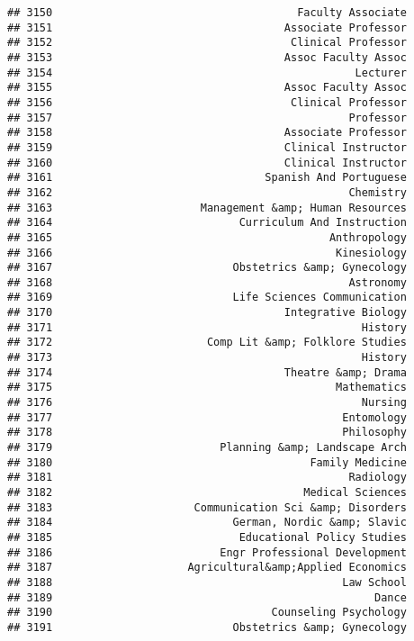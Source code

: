 \documentclass[
]{article}
\begin{document}
\begin{verbatim}
## 3150                                      Faculty Associate
## 3151                                    Associate Professor
## 3152                                     Clinical Professor
## 3153                                    Assoc Faculty Assoc
## 3154                                               Lecturer
## 3155                                    Assoc Faculty Assoc
## 3156                                     Clinical Professor
## 3157                                              Professor
## 3158                                    Associate Professor
## 3159                                    Clinical Instructor
## 3160                                    Clinical Instructor
## 3161                                 Spanish And Portuguese
## 3162                                              Chemistry
## 3163                       Management &amp; Human Resources
## 3164                             Curriculum And Instruction
## 3165                                           Anthropology
## 3166                                            Kinesiology
## 3167                            Obstetrics &amp; Gynecology
## 3168                                              Astronomy
## 3169                            Life Sciences Communication
## 3170                                    Integrative Biology
## 3171                                                History
## 3172                        Comp Lit &amp; Folklore Studies
## 3173                                                History
## 3174                                    Theatre &amp; Drama
## 3175                                            Mathematics
## 3176                                                Nursing
## 3177                                             Entomology
## 3178                                             Philosophy
## 3179                          Planning &amp; Landscape Arch
## 3180                                        Family Medicine
## 3181                                              Radiology
## 3182                                       Medical Sciences
## 3183                      Communication Sci &amp; Disorders
## 3184                            German, Nordic &amp; Slavic
## 3185                             Educational Policy Studies
## 3186                          Engr Professional Development
## 3187                     Agricultural&amp;Applied Economics
## 3188                                             Law School
## 3189                                                  Dance
## 3190                                  Counseling Psychology
## 3191                            Obstetrics &amp; Gynecology

\end{verbatim}
\end{document}
